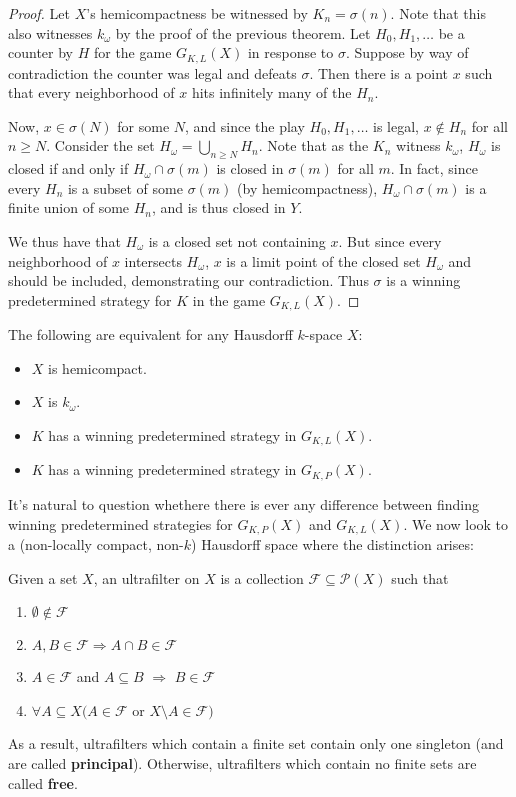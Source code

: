 \begin{proof}
Let $X$'s hemicompactness be witnessed by $K_n=\sigma(n)$. Note that this also witnesses $k_\omega$ by the proof of the previous theorem. Let $H_0,H_1,\dots$ be a counter by $H$ for the game $G_{K,L}(X)$ in response to $\sigma$. Suppose by way of contradiction the counter was legal and defeats $\sigma$. Then there is a point $x$ such that every neighborhood of $x$ hits infinitely many of the $H_n$.

Now, $x\in\sigma(N)$ for some $N$, and since the play $H_0,H_1,\dots$ is legal, $x\not\in H_n$ for all $n\geq N$. Consider the set $H_\omega=\bigcup_{n\geq N} H_n$. Note that as the $K_n$ witness $k_\omega$, $H_\omega$ is closed if and only if $H_\omega \cap \sigma(m)$ is closed in $\sigma(m)$ for all $m$. In fact, since every $H_n$ is a subset of some $\sigma(m)$ (by hemicompactness), $H_\omega \cap \sigma(m)$ is a finite union of some $H_n$, and is thus closed in $Y$.

We thus have that $H_\omega$ is a closed set not containing $x$. But since every neighborhood of $x$ intersects $H_\omega$, $x$ is a limit point of the closed set $H_\omega$ and should be included, demonstrating our contradiction. Thus $\sigma$ is a winning predetermined strategy for $K$ in the game $G_{K,L}(X)$.
\end{proof}

\begin{corollary}
The following are equivalent for any Hausdorff $k$-space $X$:
  \begin{itemize}
  \item $X$ is hemicompact.
  \item $X$ is $k_{\omega}$.
  \item $K$ has a winning predetermined strategy in $G_{K,L}(X)$.
  \item $K$ has a winning predetermined strategy in $G_{K,P}(X)$.
  \end{itemize}
\end{corollary}

It's natural to question whethere there is ever any difference between finding winning predetermined strategies for $G_{K,P}(X)$ and $G_{K,L}(X)$. We now look to a (non-locally compact, non-$k$) Hausdorff space where the distinction arises:

\begin{definition}
Given a set $X$, an ultrafilter on $X$ is a collection $\mathcal{F}\subseteq\mathcal{P}(X)$ such that
    \begin{enumerate}
    \item $\emptyset\not\in \mathcal{F}$
    \item $A,B\in\mathcal{F} \Rightarrow A\cap B \in \mathcal{F}$
    \item $A\in\mathcal{F}$ and $A \subseteq B$ $\Rightarrow$ $B\in\mathcal{F}$
    \item $\forall A \subseteq X(A\in\mathcal{F}$ or $X\setminus A \in \mathcal{F})$
    \end{enumerate}
As a result, ultrafilters which contain a finite set contain only one singleton (and are called \textbf{principal}). Otherwise, ultrafilters which contain no finite sets are called \textbf{free}.
\end{definition}


